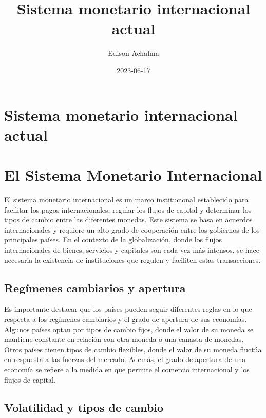 \documentclass[
  jou,
  floatsintext,
  longtable,
  a4paper,
  nolmodern,
  notxfonts,
  notimes,
  12pt,
  colorlinks=true,linkcolor=blue,citecolor=blue,urlcolor=blue]{apa7}
\title{Sistema monetario internacional actual}
\author{Edison Achalma}
\affiliation{
{Escuela Profesional de Economía, Universidad Nacional de San Cristóbal
de Huamanga}}
\date{2023-06-17}
\begin{document}
\maketitle


\hypertarget{toc}{}
\tableofcontents
\newpage
\section[Introduction]{Sistema monetario internacional actual}

\setcounter{secnumdepth}{3}

\setlength\LTleft{0pt}




\section{El Sistema Monetario
Internacional}\label{el-sistema-monetario-internacional}

El sistema monetario internacional es un marco institucional establecido
para facilitar los pagos internacionales, regular los flujos de capital
y determinar los tipos de cambio entre las diferentes monedas. Este
sistema se basa en acuerdos internacionales y requiere un alto grado de
cooperación entre los gobiernos de los principales países. En el
contexto de la globalización, donde los flujos internacionales de
bienes, servicios y capitales son cada vez más intensos, se hace
necesaria la existencia de instituciones que regulen y faciliten estas
transacciones.

\subsection{Regímenes cambiarios y
apertura}\label{reguxedmenes-cambiarios-y-apertura}

Es importante destacar que los países pueden seguir diferentes reglas en
lo que respecta a los regímenes cambiarios y el grado de apertura de sus
economías. Algunos países optan por tipos de cambio fijos, donde el
valor de su moneda se mantiene constante en relación con otra moneda o
una canasta de monedas. Otros países tienen tipos de cambio flexibles,
donde el valor de su moneda fluctúa en respuesta a las fuerzas del
mercado. Además, el grado de apertura de una economía se refiere a la
medida en que permite el comercio internacional y los flujos de capital.

\subsection{Volatilidad y tipos de
cambio}\label{volatilidad-y-tipos-de-cambio}
\end{document}
